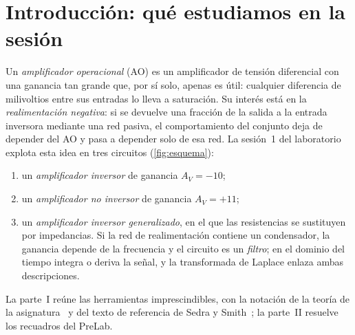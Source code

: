 \section{Introducción: qué estudiamos en la sesión}\label{sec:introduccion}
Un \emph{amplificador operacional} (AO) es un amplificador de tensión diferencial con una
ganancia tan grande que, por sí solo, apenas es útil: cualquier diferencia de milivoltios
entre sus entradas lo lleva a saturación. Su interés está en la \emph{realimentación
negativa}: si se devuelve una fracción de la salida a la entrada inversora mediante una red
pasiva, el comportamiento del conjunto deja de depender del AO y pasa a depender solo de esa
red. La sesión~1 del laboratorio~\cite{GUION-S1} explota esta idea en tres circuitos
(\cref{fig:esquema}):
\begin{enumerate}
  \item un \emph{amplificador inversor} de ganancia $A_V=-10$;
  \item un \emph{amplificador no inversor} de ganancia $A_V=+11$;
  \item un \emph{amplificador inversor generalizado}, en el que las resistencias se sustituyen
        por impedancias. Si la red de realimentación contiene un condensador, la ganancia
        depende de la frecuencia y el circuito es un \emph{filtro}; en el dominio del tiempo
        integra o deriva la señal, y la transformada de Laplace enlaza ambas descripciones.
\end{enumerate}
La parte~I reúne las herramientas imprescindibles, con la notación de la teoría de la
asignatura~\cite{TEORIA-EA,TEORIA-ADICIONAL,TEORIA-LAPLACE} y del texto de referencia
de Sedra y Smith~\cite{SEDRA}; la parte~II resuelve los recuadros del PreLab.


